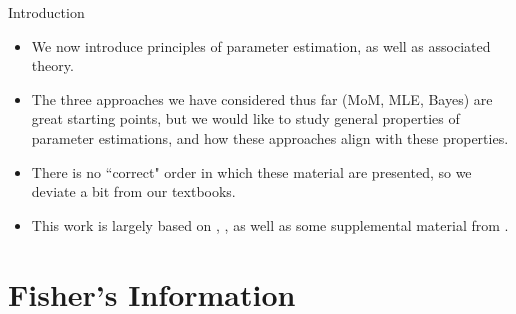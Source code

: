 \begin{frame}[allowframebreaks]{Introduction}

\begin{itemize}
  \item We now introduce principles of parameter estimation, as well as associated theory.
  \item The three approaches we have considered thus far (MoM, MLE, Bayes) are great starting points, but we would like to study general properties of parameter estimations, and how these approaches align with these properties.
  \item There is no ``correct" order in which these material are presented, so we deviate a bit from our textbooks.
  \item This work is largely based on \citet[][Sections~8.5.2, 8.7--8.8]{rice07}, \citet[][Chapters~6, 7, 10]{casella24}, as well as some supplemental material from \citet{pawitan01}.
\end{itemize}

\end{frame}

\section{Fisher's Information}

